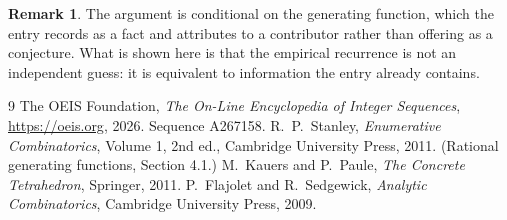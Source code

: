 \documentclass[11pt,a4paper]{article}
\theoremstyle{plain}
\theoremstyle{definition}
\newtheorem{remark}[theorem]{Remark}
\begin{document}
\begin{remark}
The argument is conditional on the generating function, which the entry records as a fact and
attributes to a contributor rather than offering as a conjecture. What is shown here is that
the empirical recurrence is not an independent guess: it is equivalent to information the
entry already contains.
\end{remark}

\begin{thebibliography}{9}
 The OEIS Foundation, \emph{The On-Line Encyclopedia of Integer
Sequences}, \url{https://oeis.org}, 2026. Sequence A267158.
 R.~P.~Stanley, \emph{Enumerative Combinatorics}, Volume 1, 2nd ed.,
Cambridge University Press, 2011. (Rational generating functions, Section 4.1.)
 M.~Kauers and P.~Paule, \emph{The Concrete Tetrahedron}, Springer, 2011.
 P.~Flajolet and R.~Sedgewick, \emph{Analytic Combinatorics}, Cambridge
University Press, 2009.
\end{thebibliography}
\end{document}

